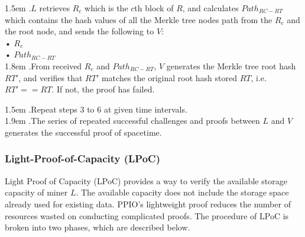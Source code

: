 \documentclass[10pt,a4paper]{article}
\begin{document}
\hangindent 1.5em
.\quad $L$ retrieves $R_{c}$ which is the $c$th block of $R$, and calculates $Path_{RC-RT}$ which contains the hash values of all the Merkle tree nodes path from the $R_{c}$ and the root node, and sends the following to $V$:
 \\   •  $R_{c}$\\ 
   •  $Path_{RC-RT}$
   \vspace{-0.5em}
\\

\hangindent 1.8em
.\quad From received $R_{c}$ and $Path_{RC-RT}$, $V$ generates the Merkle tree root hash $RT'$, and verifies that $RT'$ matches the original root hash stored $RT$, i.e. $RT'==RT$. If not, the proof has failed.\\
\vspace{-0.8em}

\hangindent 1.5em
.\quad  Repeat steps 3 to 6 at given time intervals.
\vspace{-0.8em}
\\

\hangindent 1.9em
.\quad The series of repeated successful challenges and proofs between $L$ and $V$ generates the successful proof of spacetime.
\vspace{-0.5em}
        \subsubsection{Light-Proof-of-Capacity (LPoC)}  %
Light Proof of Capacity (LPoC) provides a way to verify the available storage capacity of miner $L$. The available capacity does not include the storage space already used for existing data. PPIO's lightweight proof reduces the number of resources wasted on conducting complicated proofs. The procedure of LPoC is broken into two phases, which are described below.
\vspace{-0.5em}
\\
\end{document}
